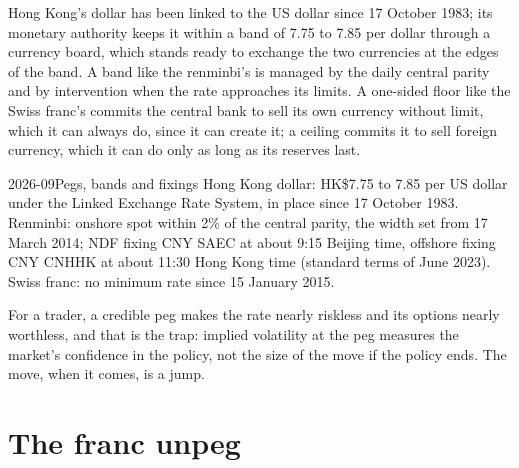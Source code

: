 Hong Kong's dollar has been linked to the US dollar since 17 October 1983; its
monetary authority keeps it within a band of 7.75 to 7.85 per dollar through a
currency board, which stands ready to exchange the two currencies at the edges of
the band. A band like the renminbi's is managed by the daily
central parity and by intervention when the rate approaches its limits. A
one-sided floor like the Swiss franc's commits the central bank to sell its own
currency without limit, which it can always do, since it can create it; a
ceiling commits it to sell foreign currency, which it can do only as long as its
reserves last.

\begin{dated}{2026-09}{Pegs, bands and fixings}\label{dat:m2:emerging-market-fx-and-ndfs:regimes}
Hong Kong dollar: HK\$7.75 to 7.85 per US dollar under the Linked Exchange Rate
System, in place since 17 October 1983. Renminbi: onshore spot within 2\% of the
central parity, the width set from 17 March 2014; NDF fixing CNY SAEC at about
9:15 Beijing time, offshore fixing CNY CNHHK at about 11:30 Hong Kong time
(standard terms of June 2023). Swiss franc: no minimum rate since 15 January
2015.
\end{dated}

For a trader, a credible peg makes the rate nearly riskless and its options
nearly worthless, and that is the trap: implied volatility at the peg measures
the market's confidence in the policy, not the size of the move if the policy
ends. The move, when it comes, is a jump.

\section{The franc unpeg}

\begin{omfigure}

\label{fig:m2:emerging-market-fx-and-ndfs:eurchf}
\end{omfigure}

